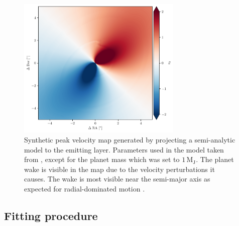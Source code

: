 \begin{figure}
    \centering
    \includegraphics[width = 0.7\textwidth]{figures/thesis_contours_obs_model.pdf}
    \caption{Synthetic peak velocity map generated by projecting a semi-analytic model to the emitting layer. Parameters used in the model taken from \citet{calcino2022}, except for the planet mass which was set to $1 \, \mathrm{M_J}$. The planet wake is visible in the map due to the velocity perturbations it causes. The wake is most visible near the semi-major axis as expected for radial-dominated motion \citep{rafikov2002a,bollati2021,calcino2022}.}
    \label{fig:model_v0}
\end{figure}

\subsection{Fitting procedure}

